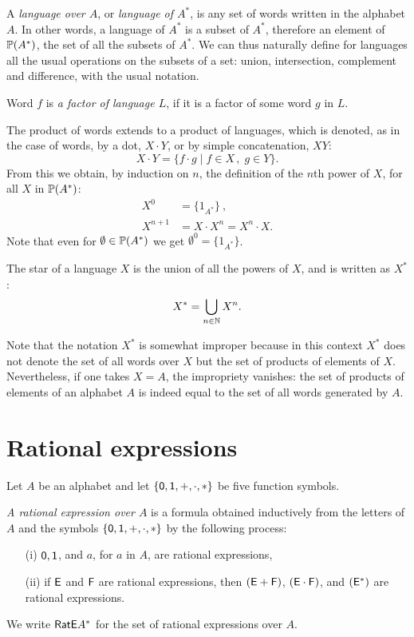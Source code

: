 A \emph{language over $A$}, or \emph{language of $A^*$}, is any set of words written in the alphabet $A$. In other words, a language of $A^*$ is a subset of $A^*$, therefore an element of $\mathbb{P}(A^*)$, the set of all the subsets of $A^*$. We can thus naturally define for languages all the usual operations on the subsets of a set: union, intersection, complement and difference, with the usual notation.

Word $f$ is \emph{a factor of language $L$}, if it is a factor of some word $g$ in $L$.

The product of words extends to a product of languages, which is denoted, as in the case of words, by a dot, $X \cdot Y$, or by simple concatenation, $X Y$:
\[
    X \cdot Y = \{ f \cdot g \mid f \in X \, , \; g \in Y \}.
\]
From this we obtain, by induction on $n$, the definition of the $n$th power of $X$, for all $X$ in $\mathbb{P}(A^*)$:
\begin{align*}
    X^0 &= \{1_{A^*}\} \: ,\\
    X^{n+1} &= X \cdot X^n = X^n \cdot X.
\end{align*}
Note that even for $\emptyset \in \mathbb{P}(A^*)$ we get $\emptyset^0 = \{1_{A^*}\}$.

The star of a language $X$ is the union of all the powers of $X$, and is written as $X^*$:
\[
    X^* = \bigcup_{n \in \mathbb{N}} X^n.
\]

Note that the notation $X^*$ is somewhat improper because in this context $X^*$ does not denote the set of all words over $X$ but the set of products of elements of $X$. Nevertheless, if one takes $X = A$, the impropriety vanishes: the set of products of elements of an alphabet $A$ is indeed equal to the set of all words generated by $A$.

\section{Rational expressions}

Let $A$ be an alphabet and let $\{{\mathsf{0}}, {\mathsf{1}}, +, \cdot, *\}$ be five function symbols.

\begin{defn}
    \emph{A rational expression over $A$} is a formula obtained inductively from the letters of $A$ and the symbols $\{{\mathsf{0}}, {\mathsf{1}}, +, \cdot, *\}$ by the following process:
    \begin{itemize}
        \item[(i)] ${\mathsf{0}}, {\mathsf{1}}$, and $a$, for $a$ in $A$, are rational expressions,
        \item[(ii)] if ${\mathsf{E}}$ and ${\mathsf{F}}$ are rational expressions, then $({\mathsf{E}} + {\mathsf{F}})$, $({\mathsf{E}} \cdot {\mathsf{F}})$, and $({\mathsf{E}}^*)$ are rational expressions.
    \end{itemize}
    We write ${\mathsf{RatE}} A^*$ for the set of rational expressions over $A$.
\end{defn}

